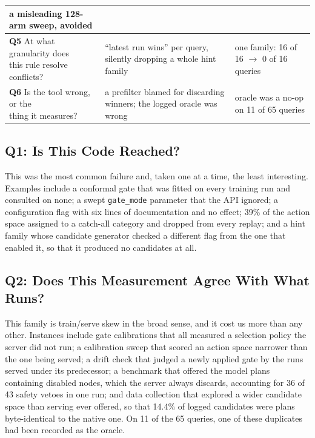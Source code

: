 \documentclass[conference]{IEEEtran}
\begin{document}
\begin{table}[t]
\begin{tabular}{|l|p{7.2cm}|p{4.4cm}|}
  a misleading 128-arm sweep, avoided \\
\hline
\makecell[l]{\textbf{Q5} At what granularity does\\this rule resolve conflicts?} &
  ``latest run wins'' per query, silently dropping a whole hint family &
  one family: 16 of 16 $\rightarrow$ 0 of 16 queries \\
\hline
\makecell[l]{\textbf{Q6} Is the tool wrong, or the\\thing it measures?} &
  a prefilter blamed for discarding winners; the logged oracle was wrong &
  oracle was a no-op on 11 of 65 queries \\
\hline
\end{tabular}
\end{table}

\subsection{Q1: Is This Code Reached?}
\label{sec:q1}

This was the most common failure and, taken one at a time, the least
interesting. Examples include a conformal gate that was fitted on every training
run and consulted on none; a swept \texttt{gate\_mode} parameter that the API
ignored; a configuration flag with six lines of documentation and no effect;
39\% of the action space assigned to a catch-all category and dropped from every
replay; and a hint family whose candidate generator checked a different flag
from the one that enabled it, so that it produced no candidates at all.

\subsection{Q2: Does This Measurement Agree With What Runs?}
\label{sec:q2}

This family is train/serve skew in the broad sense, and it cost us more than
any other. Instances include gate calibrations that all measured a selection
policy the server did not run; a calibration sweep that scored an action space
narrower than the one being served; a drift check that judged a newly applied
gate by the runs served under its predecessor; a benchmark that offered the
model plans containing disabled nodes,
which the server always discards, accounting for 36 of 43 safety vetoes in one
run; and data collection that explored a wider candidate space than serving
ever offered, so that 14.4\% of logged candidates were plans byte-identical to
the native one. On 11 of the 65 queries, one of these duplicates had been
recorded as the oracle.
\end{document}
